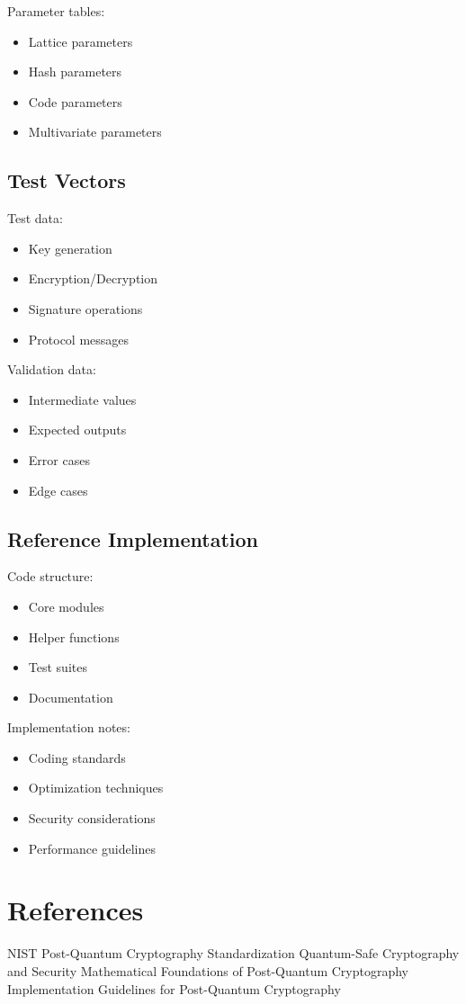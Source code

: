 \documentclass[12pt]{article}
\begin{document}
Parameter tables:

\begin{itemize}
\item Lattice parameters
\item Hash parameters
\item Code parameters
\item Multivariate parameters
\end{itemize}

\subsection{Test Vectors}

Test data:

\begin{itemize}
\item Key generation
\item Encryption/Decryption
\item Signature operations
\item Protocol messages
\end{itemize}

Validation data:

\begin{itemize}
\item Intermediate values
\item Expected outputs
\item Error cases
\item Edge cases
\end{itemize}

\subsection{Reference Implementation}

Code structure:

\begin{itemize}
\item Core modules
\item Helper functions
\item Test suites
\item Documentation
\end{itemize}

Implementation notes:

\begin{itemize}
\item Coding standards
\item Optimization techniques
\item Security considerations
\item Performance guidelines
\end{itemize}

\section{References}

\begin{thebibliography}{99}
 NIST Post-Quantum Cryptography Standardization
 Quantum-Safe Cryptography and Security
 Mathematical Foundations of Post-Quantum Cryptography
 Implementation Guidelines for Post-Quantum Cryptography
\end{thebibliography}
\end{document}
